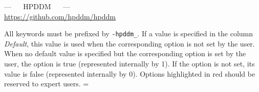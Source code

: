 \documentclass{article}
\begin{document}
\begin{center} {\LARGE --- $\quad$ HPDDM $\quad$ ---} \\[5pt] \url{https://github.com/hpddm/hpddm} \end{center}
    All keywords must be prefixed by \texttt{-hpddm\_}. If a value is specified in the column \emph{Default}, this value is used when the corresponding option is not set by the user. When no default value is specified but the corresponding option is set by the user, the option is true (represented internally by 1). If the option is not set, its value is false (represented internally by 0). Options highlighted in \colorbox{LightRed}{red} should be reserved to expert users.
\vspace*{\parspace}
\newdimen\origiwspc
\origiwspc=\font
\newlength\LTbackup
\setlength{\LTbackup}{\LTleft}
\setlength{\LTleft}{0.15cm}
\end{document}
